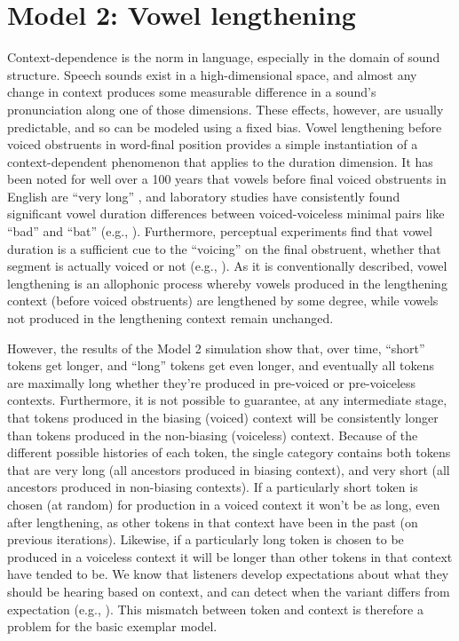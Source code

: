 \section{\label{subsec:Model-2:-Lengthening}Model 2: Vowel lengthening}

Context-dependence is the norm in language, especially in the domain
of sound structure. Speech sounds exist in a high-dimensional space,
and almost any change in context produces some measurable difference
in a sound's pronunciation along one of those dimensions. These effects,
however, are usually predictable, and so can be modeled using a fixed
bias. Vowel lengthening before voiced obstruents in word-final position
provides a simple instantiation of a context-dependent phenomenon
that applies to the duration dimension. It has been noted for well
over a 100 years that vowels before final voiced obstruents in English
are “very long” \citep[59]{Sweet1880}, and laboratory
studies have consistently found significant vowel duration differences
between voiced-voiceless minimal pairs like “bad” and “bat”
(e.g., \citealt{peterson1960duration,chen1970vowel}). Furthermore,
perceptual experiments find that vowel duration is a sufficient cue
to the “voicing” on the final obstruent, whether that segment
is actually voiced or not (e.g., \citealt{raphael1972preceding,Klatt1976}).
As it is conventionally described, vowel lengthening is an allophonic
process whereby vowels produced in the lengthening context (before
voiced obstruents) are lengthened by some degree, while vowels not
produced in the lengthening context remain unchanged.

However, the results of the Model 2 simulation show that, over time,
“short” tokens get longer, and “long” tokens get even
longer, and eventually all tokens are maximally long whether they're
produced in pre-voiced or pre-voiceless contexts. Furthermore, it
is not possible to guarantee, at any intermediate stage, that tokens
produced in the biasing (voiced) context will be consistently longer
than tokens produced in the non-biasing (voiceless) context. Because
of the different possible histories of each token, the single category
contains both tokens that are very long (all ancestors produced in
biasing context), and very short (all ancestors produced in non-biasing
contexts). If a particularly short token is chosen (at random) for
production in a voiced context it won't be as long, even after lengthening,
as other tokens in that context have been in the past (on previous
iterations). Likewise, if a particularly long token is chosen to be
produced in a voiceless context it will be longer than other tokens
in that context have tended to be. We know that listeners develop
expectations about what they should be hearing based on context, and
can detect when the variant differs from expectation (e.g., \citealp{krakow1988coarticulatory,gaskell1996phonological}).
This mismatch between token and context is therefore a problem for
the basic exemplar model. 

